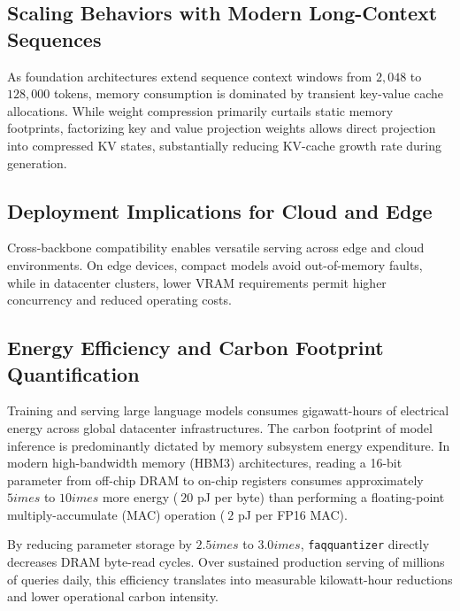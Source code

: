 \subsection{Scaling Behaviors with Modern Long-Context Sequences}
As foundation architectures extend sequence context windows from $2{,}048$ to $128{,}000$ tokens, memory consumption is dominated by transient key-value cache allocations. While weight compression primarily curtails static memory footprints, factorizing key and value projection weights allows direct projection into compressed KV states, substantially reducing KV-cache growth rate during generation.

\subsection{Deployment Implications for Cloud and Edge}
Cross-backbone compatibility enables versatile serving across edge and cloud environments. On edge devices, compact models avoid out-of-memory faults, while in datacenter clusters, lower VRAM requirements permit higher concurrency and reduced operating costs.

\subsection{Energy Efficiency and Carbon Footprint Quantification}
Training and serving large language models consumes gigawatt-hours of electrical energy across global datacenter infrastructures. The carbon footprint of model inference is predominantly dictated by memory subsystem energy expenditure. In modern high-bandwidth memory (HBM3) architectures, reading a 16-bit parameter from off-chip DRAM to on-chip registers consumes approximately $5	imes$ to $10	imes$ more energy ($~20$ pJ per byte) than performing a floating-point multiply-accumulate (MAC) operation ($~2$ pJ per FP16 MAC).

By reducing parameter storage by $2.5	imes$ to $3.0	imes$, \texttt{faqquantizer} directly decreases DRAM byte-read cycles. Over sustained production serving of millions of queries daily, this efficiency translates into measurable kilowatt-hour reductions and lower operational carbon intensity.
